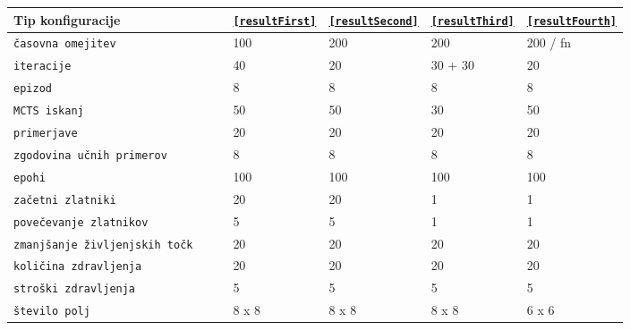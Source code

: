 \documentclass[a4paper, 12pt]{book}
\begin{document}
\begin{table}
	
	\begin{center}
		
		\begin{tabular}{p{0.4\linewidth}|p{0.1\linewidth}|p{0.1\linewidth}|p{0.1\linewidth}|p{0.1\linewidth}}
			Tip konfiguracije                          & {\tt \ref{resultFirst}} & {\tt \ref{resultSecond}} & {\tt \ref{resultThird}} & {\tt \ref{resultFourth}}\\ \hline
			{\tt časovna omejitev}                     & 100                     & 200                      & 200                     & 200 / fn                \\
			{\tt iteracije}                            & 40                      & 20                       & 30 + 30                 & 20                      \\
			{\tt epizod}                               & 8                       & 8                        & 8                       & 8                       \\
			{\tt MCTS iskanj}                          & 50                      & 50                       & 30                      & 50                      \\
			{\tt primerjave}                           & 20                      & 20                       & 20                      & 20                      \\
			{\tt zgodovina učnih primerov}             & 8                       & 8                        & 8                       & 8                       \\
			{\tt epohi}                                & 100                     & 100                      & 100                     & 100                     \\
			{\tt začetni zlatniki}                     & 20                      & 20                       & 1                       & 1                       \\
			{\tt povečevanje zlatnikov}                & 5                       & 5                        & 1                       & 1                       \\
			{\tt zmanjšanje življenjskih točk}         & 20                      & 20                       & 20                      & 20                      \\
			{\tt količina zdravljenja}                 & 20                      & 20                       & 20                      & 20                      \\
			{\tt stroški zdravljenja}                  & 5                       & 5                        & 5                       & 5                       \\
			{\tt število polj}                         & 8 x 8                   & 8 x 8                    & 8 x 8                   & 6 x 6                   \\


\end{tabular}
\end{center}
\end{table}
\end{document}
